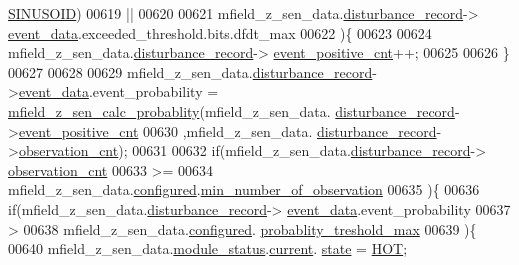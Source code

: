 \begin{DoxyCode}
      \hyperlink{a00019_a8956b2c85796334b2f0617ebd3cf9a52}{SINUSOID})
00619                  ||
00620 
00621                  mfield\_z\_sen\_data.\hyperlink{a00027_ac9b38e2c1d3f1013a88d33506c754152}{disturbance\_record}->
      \hyperlink{a00028_a8c0bda69e71ef674e60da47ad0be9ab0}{event\_data}.exceeded\_threshold.bits.dfdt\_max
00622                  )\{
00623 
00624                   mfield\_z\_sen\_data.\hyperlink{a00027_ac9b38e2c1d3f1013a88d33506c754152}{disturbance\_record}->
      \hyperlink{a00028_a7397b9d76d4b57500f27bb23d258a18a}{event\_positive\_cnt}++;
00625 
00626                   \}
00627 
00628 
00629              mfield\_z\_sen\_data.\hyperlink{a00027_ac9b38e2c1d3f1013a88d33506c754152}{disturbance\_record}->\hyperlink{a00028_a8c0bda69e71ef674e60da47ad0be9ab0}{event\_data}.event\_probability
       = \hyperlink{a00053_a8a5c3986dbe778d199b6e3b485f7a34b}{mfield\_z\_sen\_calc\_probablity}(mfield\_z\_sen\_data.
      \hyperlink{a00027_ac9b38e2c1d3f1013a88d33506c754152}{disturbance\_record}->\hyperlink{a00028_a7397b9d76d4b57500f27bb23d258a18a}{event\_positive\_cnt}
00630                                                                                    ,mfield\_z\_sen\_data.
      \hyperlink{a00027_ac9b38e2c1d3f1013a88d33506c754152}{disturbance\_record}->\hyperlink{a00028_ad5b0bac02ce266b91b2b52a1c3ea1d78}{observation\_cnt});
00631 
00632              \textcolor{keywordflow}{if}(mfield\_z\_sen\_data.\hyperlink{a00027_ac9b38e2c1d3f1013a88d33506c754152}{disturbance\_record}->
      \hyperlink{a00028_ad5b0bac02ce266b91b2b52a1c3ea1d78}{observation\_cnt}
00633                 >=
00634                 mfield\_z\_sen\_data.\hyperlink{a00027_a94b2d1f6ea4ab334c74d24984dd27843}{configured}.\hyperlink{a00021_ae8665e8bf422c1482442d6949ba28408}{min\_number\_of\_observation}
00635                )\{
00636                    \textcolor{keywordflow}{if}(mfield\_z\_sen\_data.\hyperlink{a00027_ac9b38e2c1d3f1013a88d33506c754152}{disturbance\_record}->
      \hyperlink{a00028_a8c0bda69e71ef674e60da47ad0be9ab0}{event\_data}.event\_probability
00637                     >
00638                     mfield\_z\_sen\_data.\hyperlink{a00027_a94b2d1f6ea4ab334c74d24984dd27843}{configured}.
      \hyperlink{a00021_a7e2d217b9c9051d361319180a426851c}{probablity\_treshold\_max}
00639                     )\{
00640                          mfield\_z\_sen\_data.\hyperlink{a00027_adfab5a5d8b45a93dfb13edb24e2b80e3}{module\_status}.\hyperlink{a00019_acf41ffc11da291c2f9f0fcb02ee72b98}{current}.
      \hyperlink{a00019_a6b8d8e916bc56265a3fd279bd26b6d1b}{state} = \hyperlink{a00021_a1eb14cc432874ddacd1934791dbe12a3}{HOT};

\end{DoxyCode}
